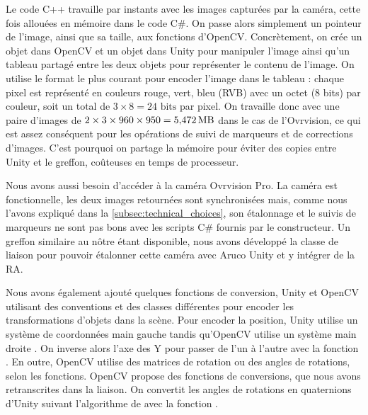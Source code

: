 Le code C++ travaille par instants avec les images capturées par la caméra, cette fois allouées en mémoire dans le code C\#. On passe alors simplement un pointeur de l'image, ainsi que sa taille, aux fonctions d'OpenCV. Concrètement, on crée un objet  dans OpenCV et un objet  dans Unity pour manipuler l'image ainsi qu'un tableau partagé entre les deux objets pour représenter le contenu de l'image. On utilise le format le plus courant pour encoder l'image dans le tableau : chaque pixel est représenté en couleurs rouge, vert, bleu (RVB) avec un octet (8 bits) par couleur, soit un total de $3 \times 8 = 24\text{ bits}$ par pixel. On travaille donc avec une paire d'images de $2 \times 3 \times 960 \times 950 = \SI{5.472}{\mega\byte}$ dans le cas de l'Ovrvision, ce qui est assez conséquent pour les opérations de suivi de marqueurs et de corrections d'images. C'est pourquoi on partage la mémoire pour éviter des copies entre Unity et le greffon, coûteuses en temps de processeur.

Nous avons aussi besoin d'accéder à la caméra Ovrvision Pro. La caméra est fonctionnelle, les deux images retournées sont synchronisées mais, comme nous l'avons expliqué dans la \autoref{subsec:technical_choices}, son étalonnage et le suivis de marqueurs ne sont pas bons avec les scripts C\# fournis par le constructeur. Un greffon similaire au nôtre étant disponible, nous avons développé la classe  de liaison  pour pouvoir étalonner cette caméra avec Aruco Unity et y intégrer de la RA.


Nous avons également ajouté quelques fonctions de conversion, Unity et OpenCV utilisant des conventions et des classes différentes pour encoder les transformations d'objets dans la scène. Pour encoder la position, Unity utilise un système de coordonnées main gauche  tandis qu'OpenCV utilise un système main droite . On inverse alors l'axe des Y pour passer de l'un à l'autre avec la fonction . En outre, OpenCV utilise des matrices de rotation ou des angles de rotations, selon les fonctions. OpenCV propose des fonctions de conversions, que nous avons retranscrites dans la liaison. On convertit les angles de rotations en quaternions d'Unity suivant l'algorithme de \cite{Baker1998} avec la fonction .


